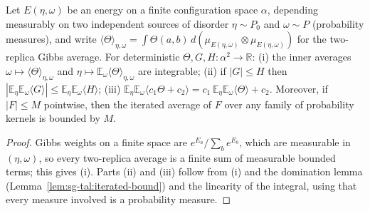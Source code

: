 \begin{lemma}
\label{lem:sg-tal:nested-two-replica}
  \leanok
{}
Let $E(\eta,\omega)$ be an energy on a finite configuration space $\alpha$, depending measurably on
two independent sources of disorder $\eta\sim P_0$ and $\omega\sim P$ (probability measures), and write
$\langle\Theta\rangle_{\eta,\omega}=\int\Theta(a,b)\,d(\mu_{E(\eta,\omega)}\otimes\mu_{E(\eta,\omega)})$ for
the two-replica Gibbs average.  For deterministic $\Theta,G,H:\alpha^2\to\mathbb R$:
(i) the inner averages $\omega\mapsto\langle\Theta\rangle_{\eta,\omega}$ and
$\eta\mapsto\mathbb E_\omega\langle\Theta\rangle_{\eta,\omega}$ are integrable;
(ii) if $|G|\le H$ then
$|\mathbb E_\eta\mathbb E_\omega\langle G\rangle|\le\mathbb E_\eta\mathbb E_\omega\langle H\rangle$;
(iii) $\mathbb E_\eta\mathbb E_\omega\langle c_1\Theta+c_2\rangle=c_1\,\mathbb E_\eta\mathbb E_\omega\langle\Theta\rangle+c_2$.
Moreover, if $|F|\le M$ pointwise, then the iterated average of $F$ over any family of probability
kernels is bounded by $M$.
\end{lemma}
\begin{proof}
  \leanok
Gibbs weights on a finite space are $e^{E_a}/\sum_b e^{E_b}$, which are measurable in
$(\eta,\omega)$, so every two-replica average is a finite sum of measurable bounded terms; this gives
(i).  Parts (ii) and (iii) follow from (i) and the domination lemma
(Lemma~\ref{lem:sg-tal:iterated-bound}) and the linearity of the integral, using that every
measure involved is a probability measure.
\end{proof}

